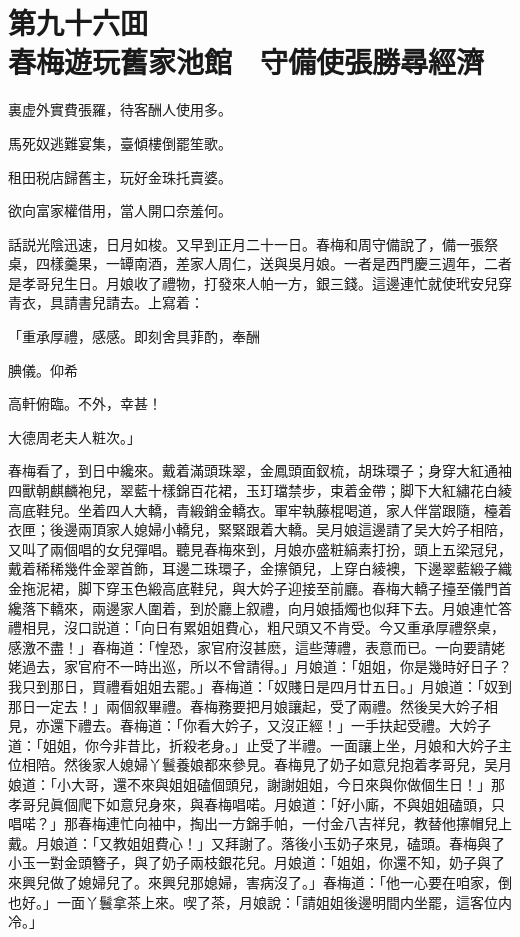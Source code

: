 
\chapter*{第九十六囬　\\春梅遊玩舊家池館　守備使張勝尋經濟}


\begin{myquote}
裏虚外實費張羅，待客酬人使用多。

馬死奴逃難宴集，臺傾樓倒罷笙歌。

租田税店歸舊主，玩好金珠托賣婆。

欲向富家權借用，當人開口奈羞何。
\end{myquote}

話説光陰迅速，日月如梭。又早到正月二十一日。春梅和周守備說了，備一張祭桌，四樣羹果，一罈南酒，差家人周仁，送與吳月娘。一者是西門慶三週年，二者是孝哥兒生日。月娘收了禮物，打發來人帕一方，銀三錢。這邊連忙就使玳安兒穿青衣，具請書兒請去。上寫着：

\begin{myquote}[\markfont]
「重承厚禮，感感。即刻舍具菲酌，奉酬

腆儀。仰希

高軒俯臨。不外，幸甚！


\raggedright{大德周老夫人粧次。」}
\end{myquote}

春梅看了，到日中纔來。戴着滿頭珠翠，金鳳頭面釵梳，胡珠環子；身穿大紅通袖四獸朝麒麟袍兒，翠藍十樣錦百花裙，玉玎璫禁步，束着金帶；脚下大紅繡花白綾高底鞋兒。坐着四人大轎，青緞銷金轎衣。軍牢執藤棍喝道，家人伴當跟隨，檯着衣匣；後邊兩頂家人媳婦小轎兒，緊緊跟着大轎。吴月娘這邊請了吴大妗子相陪，又叫了兩個唱的女兒彈唱。聽見春梅來到，月娘亦盛粧縞素打扮，頭上五梁冠兒，戴着稀稀幾件金翠首飾，耳邊二珠環子，金㩟領兒，上穿白綾襖，下邊翠藍緞子織金拖泥裙，脚下穿玉色緞高底鞋兒，與大妗子迎接至前廳。春梅大轎子擡至儀門首纔落下轎來，兩邊家人圍着，到於廳上叙禮，向月娘插燭也似拜下去。月娘連忙答禮相見，沒口説道：「向日有累姐姐費心，粗尺頭又不肯受。今又重承厚禮祭桌，感激不盡！」春梅道：「惶恐，家官府沒甚麽，這些薄禮，表意而已。一向要請姥姥過去，家官府不一時出巡，所以不曾請得。」月娘道：「姐姐，你是幾時好日子？我只到那日，買禮看姐姐去罷。」春梅道：「奴賤日是四月廿五日。」月娘道：「奴到那日一定去！」兩個叙畢禮。春梅務要把月娘讓起，受了兩禮。然後吴大妗子相見，亦還下禮去。春梅道：「你看大妗子，又沒正經！」一手扶起受禮。大妗子道：「姐姐，你今非昔比，折殺老身。」止受了半禮。一面讓上坐，月娘和大妗子主位相陪。然後家人媳婦丫鬟養娘都來參見。春梅見了奶子如意兒抱着孝哥兒，吴月娘道：「小大哥，還不來與姐姐磕個頭兒，謝謝姐姐，今日來與你做個生日！」那孝哥兒眞個爬下如意兒身來，與春梅唱喏。月娘道：「好小廝，不與姐姐磕頭，只唱喏？」那春梅連忙向袖中，掏出一方錦手帕，一付金八吉祥兒，教替他㩟帽兒上戴。月娘道：「又教姐姐費心！」又拜謝了。落後小玉奶子來見，磕頭。春梅與了小玉一對金頭簪子，與了奶子兩枝銀花兒。月娘道：「姐姐，你還不知，奶子與了來興兒做了媳婦兒了。來興兒那媳婦，害病沒了。」春梅道：「他一心要在咱家，倒也好。」一面丫鬟拿茶上來。喫了茶，月娘說：「請姐姐後邊明間内坐罷，這客位内冷。」

